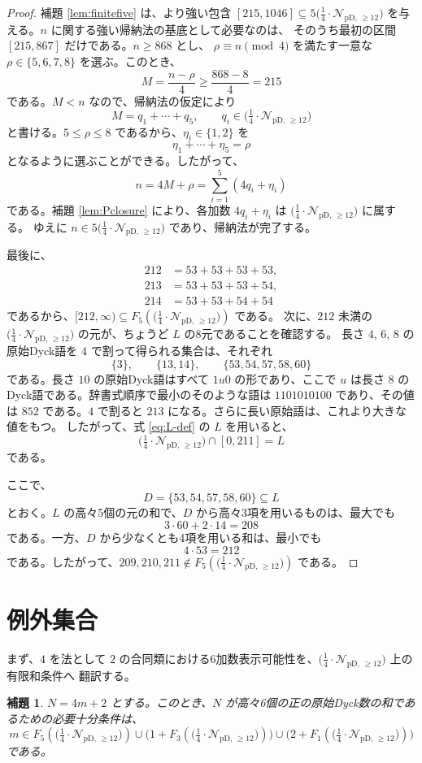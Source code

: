\documentclass[12pt]{ltjsarticle}
\theoremstyle{plain}
\newtheorem{lemma}[theorem]{補題}
\newcommand{\Pset}{\bigl(\tfrac14\cdot
  \mathcal{N}_{\mathrm{pD},\,\geq12}\bigr)}
\begin{document}
\begin{proof}
補題 \ref{lem:finitefive} は、より強い包含
$[215,1046]\subseteq5\Pset$ を与える。$n$ に関する強い帰納法の基底として必要なのは、
そのうち最初の区間 $[215,867]$ だけである。$n\geq868$ とし、
$\rho\equiv n\pmod4$ を満たす一意な $\rho\in\{5,6,7,8\}$ を選ぶ。このとき、
\[
 M=\frac{n-\rho}{4}\geq\frac{868-8}{4}=215
\]
である。$M<n$ なので、帰納法の仮定により
\[
 M=q_1+\cdots+q_5,\qquad q_i\in\Pset
\]
と書ける。$5\leq\rho\leq8$ であるから、$\eta_i\in\{1,2\}$ を
\[
 \eta_1+\cdots+\eta_5=\rho
\]
となるように選ぶことができる。したがって、
\[
 n=4M+\rho=\sum_{i=1}^{5}(4q_i+\eta_i)
\]
である。補題 \ref{lem:Pclosure} により、各加数 $4q_i+\eta_i$ は $\Pset$ に属する。
ゆえに $n\in5\Pset$ であり、帰納法が完了する。

最後に、
\[
\begin{aligned}
212&=53+53+53+53,\\
213&=53+53+53+54,\\
214&=53+53+54+54
\end{aligned}
\]
であるから、$[212,\infty)\subseteq F_5(\Pset)$ である。
次に、$212$ 未満の $\Pset$ の元が、ちょうど $L$ の8元であることを確認する。
長さ $4$, $6$, $8$ の原始Dyck語を $4$ で割って得られる集合は、それぞれ
\[
 \{3\},\qquad \{13,14\},\qquad \{53,54,57,58,60\}
\]
である。長さ $10$ の原始Dyck語はすべて $1u0$ の形であり、ここで $u$ は長さ $8$ の
Dyck語である。辞書式順序で最小のそのような語は $1101010100$ であり、その値は
$852$ である。$4$ で割ると $213$ になる。さらに長い原始語は、これより大きな値をもつ。
したがって、式 \eqref{eq:L-def} の $L$ を用いると、
\[
 \Pset\cap[0,211]=L
\]
である。

ここで、
\[
 D=\{53,54,57,58,60\}\subseteq L
\]
とおく。$L$ の高々5個の元の和で、$D$ から高々3項を用いるものは、最大でも
\[
 3\cdot60+2\cdot14=208
\]
である。一方、$D$ から少なくとも4項を用いる和は、最小でも
\[
 4\cdot53=212
\]
である。したがって、$209,210,211\notin F_5(\Pset)$ である。
\end{proof}

\section{例外集合}\label{sec:exceptions}

まず、$4$ を法として $2$ の合同類における6加数表示可能性を、$\Pset$ 上の有限和条件へ
翻訳する。

\begin{lemma}\label{lem:sixcriterion}
$N=4m+2$ とする。このとき、$N$ が高々6個の正の原始Dyck数の和であるための必要十分条件は、
\[
 m\in F_5(\Pset)
 \cup\bigl(1+F_3(\Pset)\bigr)
 \cup\bigl(2+F_1(\Pset)\bigr)
\]
である。
\end{lemma}
\end{document}
